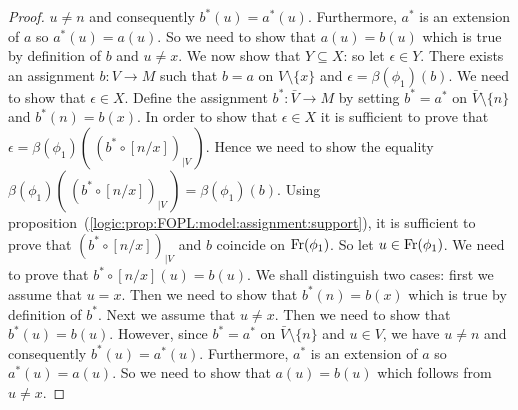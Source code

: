 \begin{proof}
$u\neq n$ and consequently $b^{*}(u)=a^{*}(u)$. Furthermore, $a^{*}$
is an extension of $a$ so $a^{*}(u)=a(u)$. So we need to show that
$a(u)=b(u)$ which is true by definition of $b$ and $u\neq x$. We now
show that $Y\subseteq X$: so let $\epsilon\in Y$. There exists an
assignment $b:V\to M$ such that $b=a$ on $V\setminus\{x\}$ and
$\epsilon=\beta(\phi_{1})(b)$. We need to show that $\epsilon\in X$.
Define the assignment $b^{*}:\bar{V}\to M$ by setting $b^{*}=a^{*}$
on $\bar{V}\setminus\{n\}$ and $b^{*}(n)=b(x)$. In order to show
that $\epsilon\in X$ it is sufficient to prove that
$\epsilon=\beta(\phi_{1})(\,(b^{*}\circ[n/x])_{|V}\,)$. Hence we
need to show the equality
$\beta(\phi_{1})(\,(b^{*}\circ[n/x])_{|V}\,)=\beta(\phi_{1})(b)$.
Using proposition~(\ref{logic:prop:FOPL:model:assignment:support}),
it is sufficient to prove that $(b^{*}\circ[n/x])_{|V}$ and $b$
coincide on $\mbox{\rm Fr}(\phi_{1})$. So let $u\in\mbox{\rm Fr}(\phi_{1})$. We need
to prove that $b^{*}\circ[n/x](u)=b(u)$. We shall distinguish two
cases: first we assume that $u=x$. Then we need to show that
$b^{*}(n)=b(x)$ which is true by definition of $b^{*}$. Next we
assume that $u\neq x$. Then we need to show that $b^{*}(u)=b(u)$.
However, since $b^{*}=a^{*}$ on $\bar{V}\setminus\{n\}$ and $u\in
V$, we have $u\neq n$ and consequently $b^{*}(u)=a^{*}(u)$.
Furthermore, $a^{*}$ is an extension of $a$ so $a^{*}(u)=a(u)$. So
we need to show that $a(u)=b(u)$ which follows from $u\neq x$.
\end{proof}

